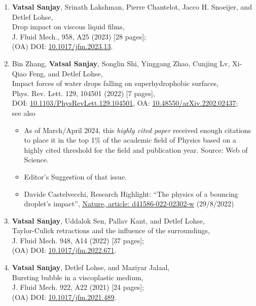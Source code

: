 \documentclass[11pt,a4paper,roman,english,colorlinks,linkcolor={red!50!black}]{moderncv}
\begin{document}
\begin{enumerate}[leftmargin=0.75cm]
	\item \textbf{Vatsal Sanjay}, Srinath Lakshman, Pierre Chantelot, Jacco H. Snoeijer, and Detlef Lohse,\\
	Drop impact on viscous liquid films,\\
	J. Fluid Mech., 958, A25 (2023) [28 pages];\\
	(OA) DOI: \href{https://doi.org/10.1017/jfm.2023.13}{10.1017/jfm.2023.13}.

	\item Bin Zhang, \textbf{Vatsal Sanjay}, Songlin Shi,  Yinggang Zhao,  Cunjing Lv,  Xi-Qiao Feng,  and Detlef Lohse,\\
	Impact forces of water drops falling on superhydrophobic surfaces,\\
	Phys. Rev. Lett. 129, 104501 (2022) [7 pages],\\
	DOI: \href{https://doi.org/10.1103/PhysRevLett.129.104501}{10.1103/PhysRevLett.129.104501}, OA:  \href{https://doi.org/10.48550/arXiv.2202.02437}{10.48550/arXiv.2202.02437};\\
	see also
	\begin{itemize}
		\item
		As of March/April 2024, this \textit{highly cited paper} received enough citations to place it in the top 1\% of the academic field of Physics based on a highly cited threshold for the field and publication year. Source: Web of Science.
		\item
		Editor's Suggestion of that issue.
		\item
		Davide Castelvecchi, Research Highlight: ``The physics of a bouncing droplet's impact'', \href{https://www.nature.com/articles/d41586-022-02302-w}{Nature, article: d41586-022-02302-w} (29/8/2022)
	\end{itemize}

	\item \textbf{Vatsal Sanjay}, Uddalok Sen, Pallav Kant, and Detlef Lohse,\\
	Taylor-Culick retractions and the influence of the surroundings,\\
	J. Fluid Mech. 948, A14  (2022) [37 pages];\\
	(OA) DOI: \href{https://doi.org/10.1017/jfm.2022.671}{10.1017/jfm.2022.671}.

	\item \textbf{Vatsal Sanjay}, Detlef Lohse, and Maziyar Jalaal,\\
	Bursting bubble in a viscoplastic medium,\\
	J. Fluid Mech. 922, A22  (2021) [24 pages];\\
	(OA) DOI: \href{https://doi.org/10.1017/jfm.2021.489}{10.1017/jfm.2021.489}.


\end{enumerate}
\end{document}

